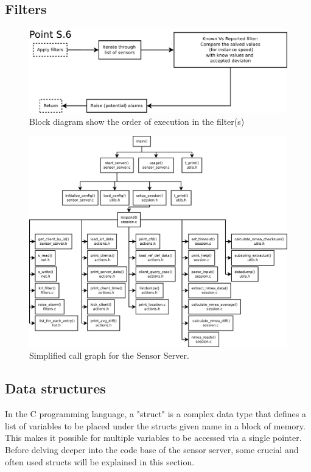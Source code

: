 \documentclass[12pt,english,a4paper]{report}
\begin{document}
\subsection{Filters}\label{filters}
\begin{figure}
\centering
  \includegraphics[scale=0.3]{filters.pdf}
   \caption[Order of execution in the filter]{Block diagram show the order of execution in the filter(s)}
   \label{server_core}
\end{figure}
\begin{figure}
\centering
  \includegraphics[scale=0.3]{server_call_graph.pdf}
   \caption[Sensor Server simplified call graph]{Simplified call graph for the Sensor Server.}
   \label{server_call_graph}
\end{figure}


\subsection{Data structures}
In the C programming language, a "struct" is a complex data type that defines a list of variables to be placed under the structs given name in a block of memory. This makes it possible for multiple variables to be accessed via a single pointer. Before delving deeper into the code base of the sensor server, some crucial and often used structs will be explained in this section.
\end{document}
